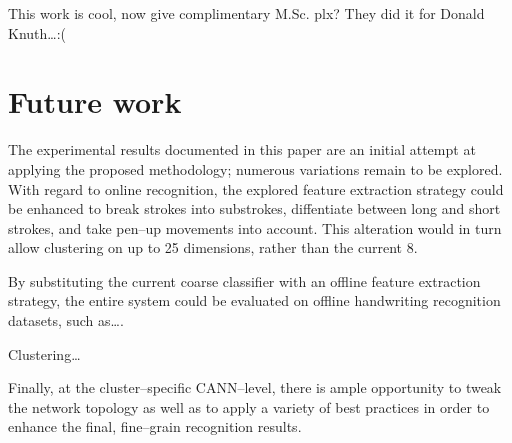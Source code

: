 \documentclass[10pt,conference,a4paper]{IEEEtran}
\begin{document}
	This work is cool, now give complimentary M.Sc. plx?
	They did it for Donald Knuth\ldots :(


	\section{Future work}
	\label{sec:future_work}

	The experimental results documented in this paper are an initial attempt at applying the proposed methodology;
	numerous variations remain to be explored. With regard to online recognition, the explored feature extraction
	strategy could be enhanced to break strokes into substrokes, diffentiate between long and short strokes, and take
	pen--up movements into account. This alteration would in turn allow clustering on up to 25 dimensions, rather than the current 8.

	By substituting the current coarse classifier with an offline feature extraction strategy, the entire system could
	be evaluated on offline handwriting recognition datasets, such as\ldots. 

	Clustering\ldots

	Finally, at the cluster--specific CANN--level, there is ample opportunity to tweak the network topology as well as
	to apply a variety of best practices \cite{simard2003best} in order to enhance the final, fine--grain recognition results.



	
\end{document}
